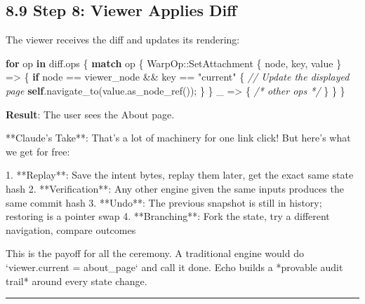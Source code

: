 \documentclass[
  11pt,
]{book}
\newenvironment{Shaded}{}{}
\newcommand{\CommentTok}[1]{\textcolor[rgb]{0.38,0.63,0.69}{\textit{#1}}}
\newcommand{\ControlFlowTok}[1]{\textcolor[rgb]{0.00,0.44,0.13}{\textbf{#1}}}
\newcommand{\KeywordTok}[1]{\textcolor[rgb]{0.00,0.44,0.13}{\textbf{#1}}}
\newcommand{\NormalTok}[1]{#1}
\newcommand{\OperatorTok}[1]{\textcolor[rgb]{0.40,0.40,0.40}{#1}}
\newcommand{\PreprocessorTok}[1]{\textcolor[rgb]{0.74,0.48,0.00}{#1}}
\newcommand{\StringTok}[1]{\textcolor[rgb]{0.25,0.44,0.63}{#1}}
\begin{document}
\subsection{8.9 Step 8: Viewer Applies
Diff}\label{step-8-viewer-applies-diff}

The viewer receives the diff and updates its rendering:

\begin{Shaded}
\begin{Highlighting}[]
\ControlFlowTok{for}\NormalTok{ op }\KeywordTok{in}\NormalTok{ diff}\OperatorTok{.}\NormalTok{ops }\OperatorTok{\{}
    \ControlFlowTok{match}\NormalTok{ op }\OperatorTok{\{}
        \PreprocessorTok{WarpOp::}\NormalTok{SetAttachment }\OperatorTok{\{}\NormalTok{ node}\OperatorTok{,}\NormalTok{ key}\OperatorTok{,}\NormalTok{ value }\OperatorTok{\}} \OperatorTok{=\textgreater{}} \OperatorTok{\{}
            \ControlFlowTok{if}\NormalTok{ node }\OperatorTok{==}\NormalTok{ viewer\_node }\OperatorTok{\&\&}\NormalTok{ key }\OperatorTok{==} \StringTok{"current"} \OperatorTok{\{}
                \CommentTok{// Update the displayed page}
                \KeywordTok{self}\OperatorTok{.}\NormalTok{navigate\_to(value}\OperatorTok{.}\NormalTok{as\_node\_ref())}\OperatorTok{;}
            \OperatorTok{\}}
        \OperatorTok{\}}
\NormalTok{        \_ }\OperatorTok{=\textgreater{}} \OperatorTok{\{} \CommentTok{/* other ops */} \OperatorTok{\}}
    \OperatorTok{\}}
\OperatorTok{\}}
\end{Highlighting}
\end{Shaded}

\textbf{Result}: The user sees the About page.

\begin{claudecommentary}
**Claude's Take**: That's a lot of machinery for one link click! But here's what we get for free:

1. **Replay**: Save the intent bytes, replay them later, get the exact same state hash
2. **Verification**: Any other engine given the same inputs produces the same commit hash
3. **Undo**: The previous snapshot is still in history; restoring is a pointer swap
4. **Branching**: Fork the state, try a different navigation, compare outcomes

This is the payoff for all the ceremony. A traditional engine would do `viewer.current = about_page` and call it done. Echo builds a *provable audit trail* around every state change.
\end{claudecommentary}

\begin{center}\rule{0.5\linewidth}{0.5pt}\end{center}
\end{document}
